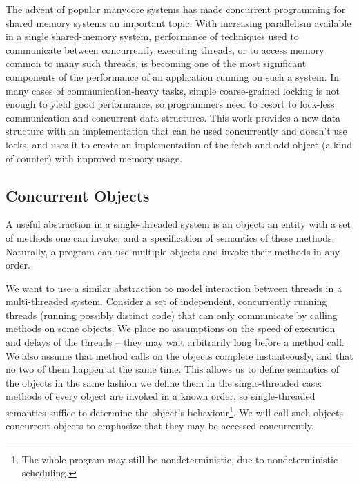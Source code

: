 \documentclass[a4paper,11pt]{article}
\begin{document}
The advent of popular manycore systems has made concurrent programming for shared memory systems an important
topic. With increasing parallelism available in a single shared-memory system, performance of techniques
used to communicate between concurrently executing threads, or to access memory common to many such threads,
is becoming one of the most significant components of the performance of an application running on such a system.
In many cases of communication-heavy tasks, simple coarse-grained locking is not enough to yield good performance,
so programmers need to resort to lock-less communication and concurrent data structures. This work provides a new
data structure with an implementation that can be used concurrently and doesn't use locks, and uses it to create
an implementation of the fetch-and-add object (a kind of counter) with improved memory usage.


\subsection{Concurrent Objects}
A useful abstraction in a single-threaded system is an object: an entity with a set of methods one can invoke,
and a specification of semantics of these methods. Naturally, a program can use multiple objects and invoke
their methods in any order.

We want to use a similar abstraction to model interaction between threads in a multi-threaded system.
Consider a set of independent, concurrently running threads (running possibly
distinct code) that can only communicate by calling methods on some objects. We place no assumptions on
the speed of execution and delays of the threads -- they may wait arbitrarily long before a method call.
We also assume that method calls on the objects complete instanteously, and that no two of them happen at the same time.
This allows us to define semantics of the objects in the same fashion we define them in the single-threaded case:
methods of every object are invoked in a known order, so single-threaded semantics suffice to determine the object's behaviour\footnote{The whole program may still be nondeterministic, due to nondeterministic scheduling.}.
We will call such objects concurrent objects to emphasize that they may be accessed concurrently.

\end{document}

